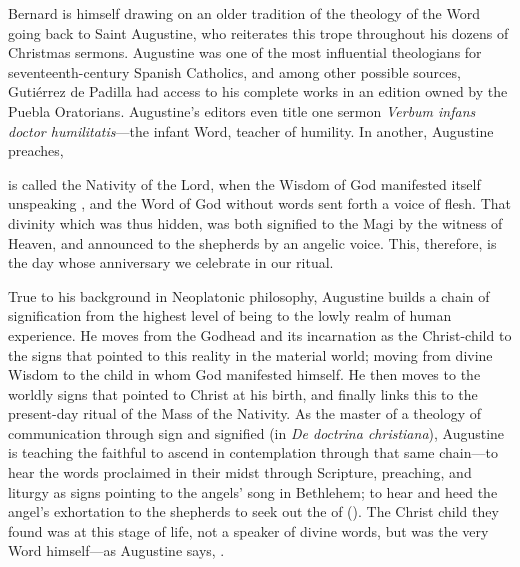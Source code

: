 Bernard is himself drawing on an older tradition of the theology of the Word
going back to Saint Augustine, who reiterates this trope throughout his dozens
of Christmas sermons.
Augustine was one of the most influential theologians for seventeenth-century
Spanish Catholics, and among other possible sources, Gutiérrez de Padilla had
access to his complete works in an edition owned by the Puebla Oratorians.
Augustine's editors even title one sermon \emph{Verbum infans doctor
humilitatis}---the infant Word, teacher of humility.%
    \Autocite[1004, heading for sermon 187]{Augustine:SermonesPL}
In another, Augustine preaches,
\begin{quoting}
     is called the Nativity of the Lord, when the Wisdom of God
    manifested itself unspeaking , and the Word of God
    without words sent forth a voice of flesh.
    That divinity which was thus hidden, was both signified to the Magi by the
    witness of Heaven, and announced to the shepherds by an angelic voice.
    This, therefore, is the day whose anniversary we celebrate in our ritual.%
        \Autocite[997, Sermo 185, In Natali Domini 2]{Augustine:SermonesPL}
\end{quoting}
True to his background in Neoplatonic philosophy, Augustine builds a chain of
signification from the highest level of being to the lowly realm of human
experience.
He moves from the Godhead and its incarnation as the Christ-child to the signs
that pointed to this reality in the material world; moving from divine Wisdom to
the child in whom God manifested himself.
He then moves to the worldly signs that pointed to Christ at his birth, and
finally links this to the present-day ritual of the Mass of the Nativity.
As the master of a theology of communication through sign and signified (in
\emph{De doctrina christiana}), Augustine is teaching the faithful to ascend in
contemplation through that same chain---to hear the words proclaimed in their
midst through Scripture, preaching, and liturgy as signs pointing to the angels'
song in Bethlehem; to hear and heed the angel's exhortation to the shepherds to
seek out the  of  ().
The Christ child they found was at this  stage of life, not a
speaker of divine words, but was the very Word himself---as Augustine says,
.


